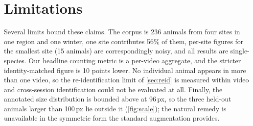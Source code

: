 \section{Limitations}
\label{sec:limitations}

Several limits bound these claims. The corpus is 236 animals from four sites in one region
and one winter, one site contributes 56\% of them, per-site figures for the smallest site
(15 animals) are correspondingly noisy, and all results are single-species. Our headline
counting metric is a per-video aggregate, and the stricter identity-matched figure is 10
points lower. No individual animal appears in more than one video, so the re-identification
limit of \cref{sec:reid} is measured within video and cross-session identification could not
be evaluated at all. Finally, the annotated size distribution is bounded above at 96\,px, so
the three held-out animals larger than 100\,px lie outside it (\cref{fig:scale}); the natural
remedy is unavailable in the symmetric form the standard augmentation provides.

